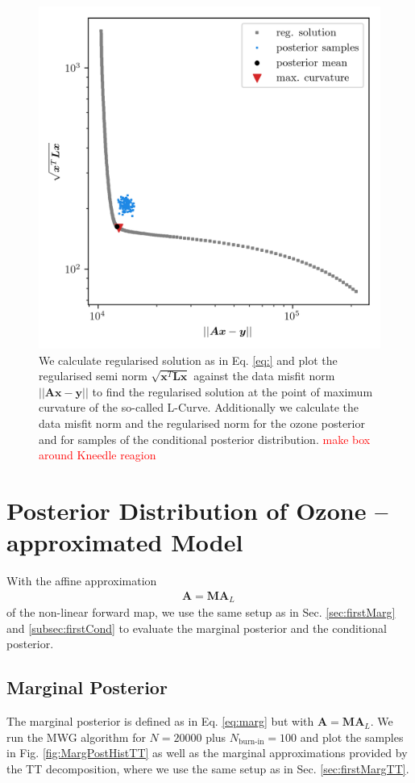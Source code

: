 \begin{figure}[ht!]
	\centering
	\includegraphics{LCurvePhD.png}
	\caption[Plot of the L-curve to find the regularised solution.]{We calculate regularised solution as in Eq. \ref{eq:} and plot the regularised semi norm $\sqrt{\bm{x}^T\bm{Lx}}$ against the data misfit norm $||\bm{Ax} -\bm{y} ||$ to find the regularised solution at the point of maximum curvature of the so-called L-Curve. Additionally we calculate the data misfit norm and the regularised norm for the ozone posterior and for samples of the conditional posterior distribution. \textcolor{red}{make box around Kneedle reagion}}
	\label{fig:LCurve}
\end{figure}

\section{Posterior Distribution of Ozone -- approximated Model}
With the affine approximation
\begin{align}
	\bm{A} =  \bm{M A}_L \, 
\end{align}
of the non-linear forward map, we use the same setup as in Sec. \ref{sec:firstMarg} and \ref{subsec:firstCond} to evaluate the marginal posterior and the conditional posterior.

\subsection{Marginal Posterior}
The marginal posterior is defined as in Eq. \ref{eq:marg} but with $ \bm{A} =  \bm{M A}_L$.
We run the MWG algorithm for $N = 20000$ plus $N_{\text{burn-in}} = 100$ and plot the samples in Fig. \ref{fig:MargPostHistTT} as well as the marginal approximations provided by the TT decomposition, where we use the same setup as in Sec. \ref{sec:firstMargTT}.

